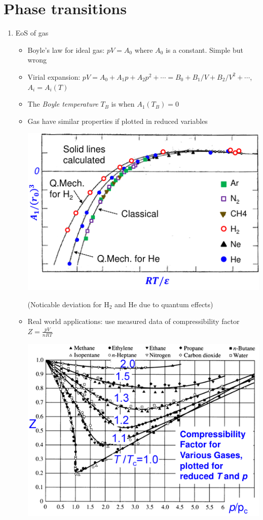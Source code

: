 \documentclass{article}
\theoremstyle{remark}
\begin{document}
\section*{Phase transitions}
\begin{enumerate}
    \item EoS of gas\begin{itemize}
            \item Boyle's law for ideal gas: $pV=A_0$ where $A_0 $ is a constant. Simple but wrong
            \item Virial expansion: $pV=A_0+A_1p+A_2p^2+\cdots=B_0+B_1/V+B_2/V^2+\cdots$, $A_i=A_i(T)$
            \item The \emph{Boyle temperature} $T_B$ is when $A_1(T_B)=0$
            \item Gas have similar properties if plotted in reduced variables
                \begin{center}
                    \includegraphics*[width=0.5\linewidth]{gas_reduced_variables.png}
                \end{center}
                (Noticable deviation for $\mathrm{H_2}$ and He due to quantum effects)
            \item Real world applications: use measured data of compressibility factor $Z=\frac{pV}{nRT}$\newline
                \begin{center}
                    \includegraphics*[width=0.5\linewidth]{compressibility factor.png}
                \end{center}
        \end{itemize}

\end{enumerate}
\end{document}
